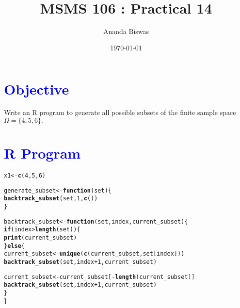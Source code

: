 \documentclass[11pt, a4paper]{article}\usepackage[]{graphicx}\usepackage[]{xcolor}
\title{MSMS 106 : Practical 14}
\author{Ananda Biswas}
\date{\today}
\makeatletter
\newcommand{\hlnum}[1]{\textcolor[rgb]{0.686,0.059,0.569}{#1}}%
\newcommand{\hlopt}[1]{\textcolor[rgb]{0,0,0}{#1}}%
\newcommand{\hldef}[1]{\textcolor[rgb]{0.345,0.345,0.345}{#1}}%
\newcommand{\hlkwa}[1]{\textcolor[rgb]{0.161,0.373,0.58}{\textbf{#1}}}%
\newcommand{\hlkwb}[1]{\textcolor[rgb]{0.69,0.353,0.396}{#1}}%
\newcommand{\hlkwc}[1]{\textcolor[rgb]{0.333,0.667,0.333}{#1}}%
\newcommand{\hlkwd}[1]{\textcolor[rgb]{0.737,0.353,0.396}{\textbf{#1}}}%
\newenvironment{kframe}{%
 \def\at@end@of@kframe{}%
 \ifinner\ifhmode%
  \def\at@end@of@kframe{\end{minipage}}%
  \begin{minipage}{\columnwidth}%
 \fi\fi%
 \def\FrameCommand##1{\hskip\@totalleftmargin \hskip-\fboxsep
 \colorbox{shadecolor}{##1}\hskip-\fboxsep
     \hskip-\linewidth \hskip-\@totalleftmargin \hskip\columnwidth}%
 \MakeFramed {\advance\hsize-\width
   \@totalleftmargin\z@ \linewidth\hsize
   \@setminipage}}%
 {\par\unskip\endMakeFramed%
 \at@end@of@kframe}
\newenvironment{knitrout}{}{} %
\makeatother
\begin{document}
\maketitle


\section*{\faArrowAltCircleRight[regular] \textcolor{blue}{Objective}}

\hspace{1cm} Write an R program to generate all possible subsets of the finite sample space $\Omega = \{4, 5, 6\}.$




\section*{\faArrowAltCircleRight[regular] \textcolor{blue}{R Program}}

\begin{knitrout}
\color{fgcolor}\begin{kframe}
\begin{alltt}
\hldef{x1} \hlkwb{<-} \hlkwd{c}\hldef{(}\hlnum{4}\hldef{,} \hlnum{5}\hldef{,} \hlnum{6}\hldef{)}
\end{alltt}
\end{kframe}
\end{knitrout}

\begin{knitrout}
\color{fgcolor}\begin{kframe}
\begin{alltt}
\hldef{generate_subset} \hlkwb{<-} \hlkwa{function}\hldef{(}\hlkwc{set}\hldef{)\{}
  \hlkwd{backtrack_subset}\hldef{(set,} \hlnum{1}\hldef{,} \hlkwd{c}\hldef{())}
\hldef{\}}

\hldef{backtrack_subset} \hlkwb{<-} \hlkwa{function}\hldef{(}\hlkwc{set}\hldef{,} \hlkwc{index}\hldef{,} \hlkwc{current_subset}\hldef{)\{}
  \hlkwa{if}\hldef{(index} \hlopt{>} \hlkwd{length}\hldef{(set))\{}
    \hlkwd{print}\hldef{(current_subset)}
  \hldef{\}} \hlkwa{else}\hldef{\{}
    \hldef{current_subset} \hlkwb{<-} \hlkwd{unique}\hldef{(}\hlkwd{c}\hldef{(current_subset, set[index]))}
    \hlkwd{backtrack_subset}\hldef{(set, index} \hlopt{+} \hlnum{1}\hldef{, current_subset)}

    \hldef{current_subset} \hlkwb{<-} \hldef{current_subset[}\hlopt{-}\hlkwd{length}\hldef{(current_subset)]}
    \hlkwd{backtrack_subset}\hldef{(set, index} \hlopt{+} \hlnum{1}\hldef{, current_subset)}
  \hldef{\}}
\hldef{\}}
\end{alltt}
\end{kframe}
\end{knitrout}
\end{document}
